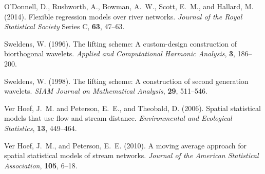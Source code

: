 \documentclass[11pt,titlepage]{article}
\begin{document}
\begin{thebibliography}{}
O'Donnell, D., Rushworth, A., Bowman, A.~W., Scott, E.~M., and Hallard, M. (2014). Flexible regression models over river networks. {\em Journal of the Royal Statistical Society} Series C, {\bf 63}, 47--63.

Sweldens, W. (1996). The lifting scheme: A custom-design construction of biorthogonal wavelets. {\em Applied and Computational Harmonic Analysis}, {\bf 3}, 186--200.

Sweldens, W. (1998). The lifting scheme: A construction of second generation wavelets. {\em SIAM Journal on Mathematical Analysis}, {\bf 29}, 511--546.

Ver Hoef, J.~M. and Peterson, E.~E., and Theobald, D. (2006). Spatial statistical models that use flow and stream distance. {\em Environmental and Ecological Statistics}, {\bf 13}, 449--464.

Ver Hoef, J.~M., and Peterson, E.~E. (2010). A moving average approach for spatial statistical models of stream networks. {\em Journal of the American Statistical Association}, {\bf 105}, 6--18.

\end{thebibliography}
\end{document}
